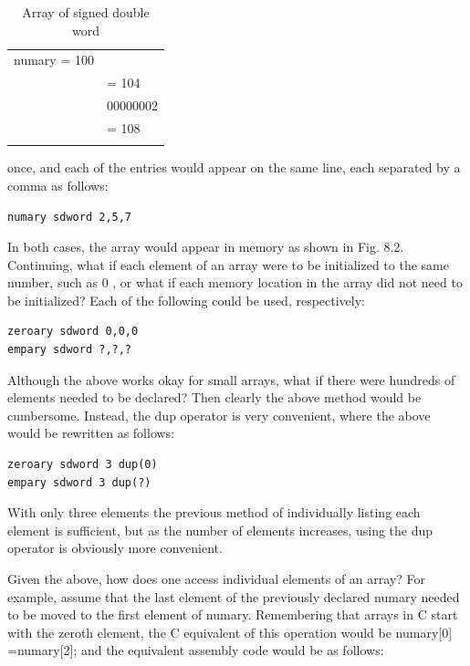 \documentclass[10pt]{book}
\begin{document}
\begin{table}[h]
\centering
\begin{tabular}{rl}
\hline
numary = 100 & \\
             & = 104 \\
             & 00000002 \\
             & = 108 \\
             &  \\
\hline
\end{tabular}
\caption{Array of signed double word}
\end{table}

once, and each of the entries would appear on the same line, each separated by a comma as follows:
\begin{verbatim}
numary sdword 2,5,7
\end{verbatim}

In both cases, the array would appear in memory as shown in Fig. 8.2.
Continuing, what if each element of an array were to be initialized to the same number, such as 0 , or what if each memory location in the array did not need to be initialized? Each of the following could be used, respectively:

\begin{verbatim}
zeroary sdword 0,0,0
empary sdword ?,?,?
\end{verbatim}

Although the above works okay for small arrays, what if there were hundreds of elements needed to be declared? Then clearly the above method would be cumbersome. Instead, the dup operator is very convenient, where the above would be rewritten as follows:

\begin{verbatim}
zeroary sdword 3 dup(0)
empary sdword 3 dup(?)
\end{verbatim}

With only three elements the previous method of individually listing each element is sufficient, but as the number of elements increases, using the dup operator is obviously more convenient.

Given the above, how does one access individual elements of an array? For example, assume that the last element of the previously declared numary needed to be moved to the first element of numary. Remembering that arrays in C start with the zeroth element, the C equivalent of this operation would be numary[0] =numary[2]; and the equivalent assembly code would be as follows:
\end{document}
